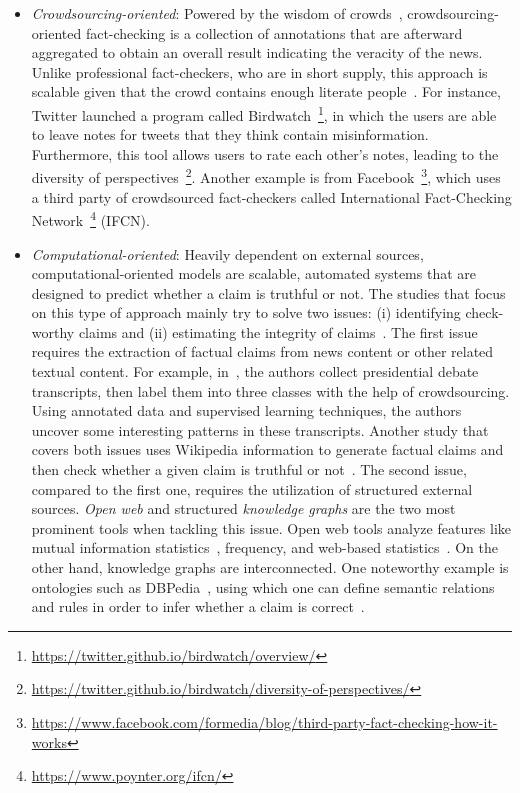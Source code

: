 \begin{description}
\begin{itemize}
        \item \emph{Crowdsourcing-oriented}: Powered by the wisdom of crowds~\parencite{WisdomOfCrowds_Galton}, crowdsourcing-oriented fact-checking is a collection of annotations that are afterward aggregated to obtain an overall result indicating the veracity of the news. Unlike professional fact-checkers, who are in short supply, this approach is scalable given that the crowd contains enough literate people~\parencite{ScalingUpFactChecking_Allen}.  For instance, Twitter launched a program called Birdwatch~\footnote{\url{https://twitter.github.io/birdwatch/overview/}}, in which the users are able to leave notes for tweets that they think contain misinformation. Furthermore, this tool allows users to rate each other’s notes, leading to the diversity of perspectives~\footnote{\url{https://twitter.github.io/birdwatch/diversity-of-perspectives/}}. Another example is from Facebook~\footnote{\url{https://www.facebook.com/formedia/blog/third-party-fact-checking-how-it-works}}, which uses a third party of crowdsourced fact-checkers called International Fact-Checking Network~\footnote{\url{https://www.poynter.org/ifcn/}} (IFCN).
        \item \emph{Computational-oriented}: Heavily dependent on external sources, computational-oriented models are scalable, automated systems that are designed to predict whether a claim is truthful or not. The studies that focus on this type of approach mainly try to solve two issues: (i) identifying check-worthy claims and (ii) estimating the integrity of claims~\parencite{FakeNewsDetectionOnSocialMediaADataMiningPerspective_Shu}. The first issue requires the extraction of factual claims from news content or other related textual content. For example, in~\parencite{DetectingCheckWorthyClaims_Hassan}, the authors collect presidential debate transcripts, then label them into three classes with the help of crowdsourcing. Using annotated data and supervised learning techniques, the authors uncover some interesting patterns in these transcripts. Another study that covers both issues uses Wikipedia information to generate factual claims and then check whether a given claim is truthful or not~\parencite{FEVER_Thorne}.  The second issue, compared to the first one, requires the utilization of structured external sources. \emph{Open web} and structured \emph{knowledge graphs} are the two most prominent tools when tackling this issue. Open web tools analyze features like mutual information statistics~\parencite{UnsupervisedNamedEntityExtraction_Etzioni}, frequency, and web-based statistics~\parencite{WebBasedStatisticalFactChecking_Magdy}.  On the other hand, knowledge graphs are interconnected. One noteworthy example is ontologies such as DBPedia~\parencite{DBPedia_Auer}, using which one can define semantic relations and rules in order to infer whether a claim is correct~\parencite{SemanticFakeNewsDetection_Bracsoveanu}.
    \end{itemize}
\end{description}

